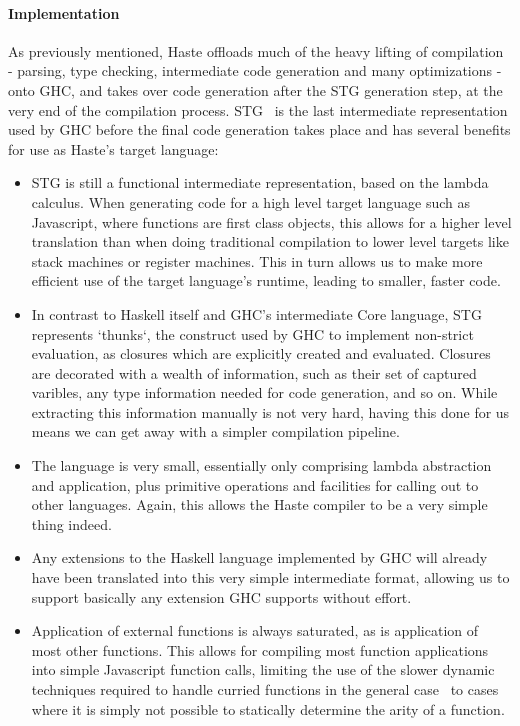 \documentclass[preprint]{sigplanconf}
\begin{document}
\paragraph{Implementation} As previously mentioned, Haste offloads much of the
heavy lifting of compilation - parsing, type checking, intermediate code
generation and many optimizations - onto GHC, and takes over code generation
after the STG generation step, at the very end of the compilation process.
STG\ \cite{stg} is the last intermediate representation used by GHC before
the final code generation takes place and has several benefits for use as
Haste's target language:

\begin{itemize}
  \item STG is still a functional intermediate representation, based on the
        lambda calculus. When generating code for a high level target language
        such as Javascript, where functions are first class objects, this
        allows for a higher level translation than when doing traditional
        compilation to lower level targets like stack machines or register
        machines. This in turn allows us to make more efficient use of the
        target language's runtime, leading to smaller, faster code.
  \item In contrast to Haskell itself and GHC's intermediate Core language, STG
        represents `thunks`, the construct used by GHC to implement non-strict
        evaluation, as closures which are explicitly created and evaluated.
        Closures are decorated with a wealth of information, such as their set
        of captured varibles, any type information needed for code generation,
        and so on. While extracting this information manually is not very hard,
        having this done for us means we can get away with a simpler
        compilation pipeline.
  \item The language is very small, essentially only comprising lambda
        abstraction and application, plus primitive operations and facilities
        for calling out to other languages. Again, this allows the Haste
        compiler to be a very simple thing indeed.
  \item Any extensions to the Haskell language implemented by GHC will already
        have been translated into this very simple intermediate format,
        allowing us to support basically any extension GHC supports without
        effort.
  \item Application of external functions is always saturated, as is
        application of most other functions. This allows for compiling most
        function applications into simple Javascript function calls, limiting
        the use of the slower dynamic techniques required to handle curried
        functions in the general case\ \cite{fastcurry} to cases where it is
        simply not possible to statically determine the arity of a function.
\end{itemize}
\end{document}

